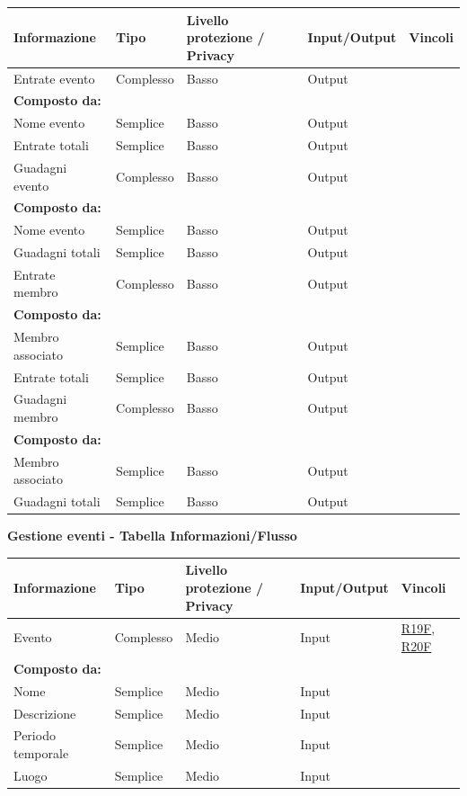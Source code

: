 \documentclass[a4paper]{article}
\begin{document}
\begin{center}
    \begin{tabularx}{1\textwidth}{|X|X|X|X|X|}
        \hline
        \textbf{Informazione} &\textbf{Tipo} & \textbf{Livello protezione / Privacy} & \textbf{Input/Output} & \textbf{Vincoli}\\
        \hline
        \hline
        Entrate evento & Complesso & Basso & Output & \\
        \textbf{Composto da:} & & & & \\
        Nome evento & Semplice & Basso & Output & \\
        Entrate totali & Semplice & Basso & Output & \\
        \hline
        Guadagni evento & Complesso & Basso & Output & \\
        \textbf{Composto da:} & & & & \\
        Nome evento & Semplice & Basso & Output & \\
        Guadagni totali & Semplice & Basso & Output & \\
        \hline
        Entrate membro & Complesso & Basso & Output & \\
        \textbf{Composto da:} & & & & \\
        Membro associato & Semplice & Basso & Output & \\
        Entrate totali & Semplice & Basso & Output & \\
        \hline
        Guadagni membro & Complesso & Basso & Output & \\
        \textbf{Composto da:} & & & & \\
        Membro associato & Semplice & Basso & Output & \\
        Guadagni totali & Semplice & Basso & Output & \\
        \hline
    \end{tabularx}
\end{center}

\newpage

\textbf{Gestione eventi  - Tabella Informazioni/Flusso}

\begin{center}
    \begin{tabularx}{1\textwidth}{|X|X|X|X|X|}
        \hline
        \textbf{Informazione} &\textbf{Tipo} & \textbf{Livello protezione / Privacy} & \textbf{Input/Output} & \textbf{Vincoli}\\
        \hline
        \hline
        Evento & Complesso & Medio & Input & \hyperlink{R19F}{R19F}, \hyperlink{R20F}{R20F} \\
        \textbf{Composto da:} & & & & \\
        Nome & Semplice & Medio & Input & \\
        Descrizione & Semplice & Medio & Input & \\
        Periodo temporale & Semplice & Medio & Input & \\
        Luogo & Semplice & Medio & Input & \\
        \hline
    \end{tabularx}
\end{center}
\end{document}
